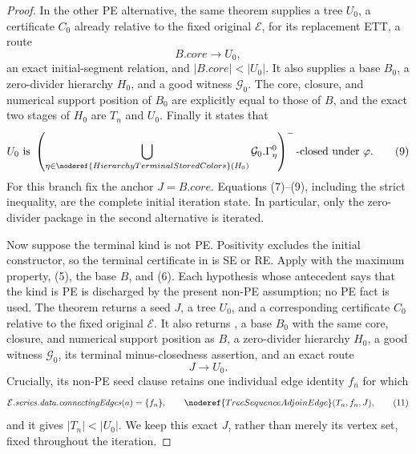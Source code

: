 \begin{proof}
In the other PE alternative, the same theorem supplies a tree \(U_0\), a
certificate \(C_0\) already relative to the fixed original
\(\mathcal E\),  for its replacement ETT, a route
\[
                         B.\mathit{core}\longrightarrow U_0,     \tag{8}
\]
an exact initial-segment relation, and
\(|B.\mathit{core}|<|U_0|\).  It also supplies a base \(B_0\), a
zero-divider hierarchy \(H_0\), and a good witness
\(\mathcal G_0\).  The core, closure, and numerical support position of
\(B_0\) are explicitly equal to those of \(B\), and the exact two stages of
\(H_0\) are \(T_n\) and \(U_0\).  Finally it states that
\[
 U_0\text{ is }
 \left(\bigcup_{\eta\in
   \noderef{HierarchyTerminalStoredColors}(H_0)}
   \mathcal G_0.\Gamma^0_\eta\right)^-
 \text{-closed under }\varphi.                                 \tag{9}
\]
For this branch fix the anchor
\(J=B.\mathit{core}\).  Equations (7)--(9), including the strict inequality,
are the complete initial iteration state.  In particular, only the
zero-divider package in the second alternative is iterated.

Now suppose the terminal kind is not PE.  Positivity excludes the initial
constructor, so the terminal certificate in
 is SE or RE.  Apply
 with the maximum property, (5), the
base \(B\), and (6).  Each hypothesis whose antecedent says that the kind
is PE is discharged by the present non-PE assumption; no PE fact is used.
The theorem returns a seed \(J\), a tree \(U_0\), and a corresponding
certificate \(C_0\) relative to the fixed original \(\mathcal E\).  It
also returns , a base \(B_0\) with the same core, closure,
and numerical support position as \(B\), a zero-divider hierarchy \(H_0\),
a good witness \(\mathcal G_0\), its terminal minus-closedness assertion,
and an exact route
\[
                              J\longrightarrow U_0.              \tag{10}
\]
Crucially, its non-PE seed clause retains one individual edge identity
\(f_n\) for which
\[
 \mathcal E.\mathit{series.data.connectingEdges}(a)=\{f_n\},
 \qquad \noderef{TreeSequenceAdjoinEdge}(T_n,f_n,J),             \tag{11}
\]
and it gives \(|T_n|<|U_0|\).  We keep this exact \(J\), rather than merely
its vertex set, fixed throughout the iteration.


\end{proof}
